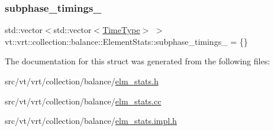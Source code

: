 \mbox{\label{structvt_1_1vrt_1_1collection_1_1balance_1_1_element_stats_a27ee2ef1979d4e4e9e4ca34fa8e88591}} 
\subsubsection{\texorpdfstring{subphase\+\_\+timings\+\_\+}{subphase\_timings\_}}
{\footnotesize\ttfamily std\+::vector$<$std\+::vector$<$\hyperlink{namespacevt_a876a9d0cd5a952859c72de8a46881442}{Time\+Type}$>$ $>$ vt\+::vrt\+::collection\+::balance\+::\+Element\+Stats\+::subphase\+\_\+timings\+\_\+ = \{\}\hspace{0.3cm}{\ttfamily [protected]}}



The documentation for this struct was generated from the following files\+:\begin{DoxyCompactItemize}
\item 
src/vt/vrt/collection/balance/\hyperlink{elm__stats_8h}{elm\+\_\+stats.\+h}\item 
src/vt/vrt/collection/balance/\hyperlink{elm__stats_8cc}{elm\+\_\+stats.\+cc}\item 
src/vt/vrt/collection/balance/\hyperlink{elm__stats_8impl_8h}{elm\+\_\+stats.\+impl.\+h}\end{DoxyCompactItemize}
